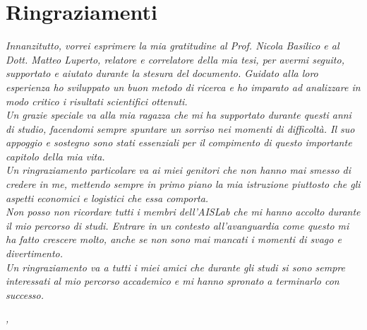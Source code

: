 
\cleardoublepage
{}
{}

\bigskip

\begingroup
\let\clearpage\relax
\let\cleardoublepage\relax
\let\cleardoublepage\relax

\chapter*{Ringraziamenti}

\noindent \textit{Innanzitutto, vorrei esprimere la mia gratitudine al Prof. Nicola Basilico e al Dott. Matteo Luperto, relatore e correlatore della mia tesi, per avermi seguito, supportato e aiutato durante la stesura del documento. Guidato alla loro esperienza ho sviluppato un buon metodo di ricerca e ho imparato ad analizzare in modo critico i risultati scientifici ottenuti.}\\

\noindent \textit{Un grazie speciale va alla mia ragazza che mi ha supportato durante questi anni di studio, facendomi sempre spuntare un sorriso nei momenti di difficoltà. Il suo appoggio e sostegno sono stati essenziali per il compimento di questo importante capitolo della mia vita. }\\

\noindent \textit{Un ringraziamento particolare va ai miei genitori che non hanno mai smesso di credere in me, mettendo sempre in primo piano la mia istruzione piuttosto che gli aspetti economici e logistici che essa comporta.}\\

\noindent \textit{Non posso non ricordare tutti i membri dell'AISLab che mi hanno accolto durante il mio percorso di studi. Entrare in un contesto all'avanguardia come questo mi ha fatto crescere molto, anche se non sono mai mancati i momenti di svago e divertimento.}\\

\noindent \textit{Un ringraziamento va a tutti i miei amici che durante gli studi si sono sempre interessati al mio percorso accademico e mi hanno spronato a terminarlo con successo.}\\

\bigskip

\noindent\textit{\myLocation, \myTime}
\hfill \myName

\endgroup

